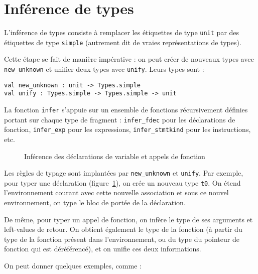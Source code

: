 \section{Inférence de types}

L'inférence de types consiste à remplacer les étiquettes de type \texttt{unit}
par des étiquettes de type \texttt{simple} (autrement dit de vraies
représentations de types).

Cette étape se fait de manière impérative : on peut créer de nouveaux types avec
\texttt{new\_unknown} et unifier deux types
avec \texttt{unify}. Leurs types sont :

\begin{verbatim}
val new_unknown : unit -> Types.simple
val unify : Types.simple -> Types.simple -> unit
\end{verbatim}

La fonction \texttt{infer} s'appuie sur un ensemble de fonctions récursivement
définies portant sur chaque type de fragment : \texttt{infer\_fdec} pour les
déclarations de fonction, \texttt{infer\_exp} pour les expressions,
\texttt{infer\_stmtkind} pour les instructions, etc.

\begin{figure}



\caption{Inférence des déclarations de variable et appels de
         fonction}

\label{fig:implem-unif-stmt}
\end{figure}

Les règles de typage sont implantées par \texttt{new\_unknown} et
\texttt{unify}. Par exemple, pour typer une déclaration
(figure~\ref{fig:implem-unif-stmt}), on crée un nouveau
type \texttt{t0}. On étend l'environnement courant avec cette nouvelle
association et sous ce nouvel environnement, on type le bloc de portée de la
déclaration.

De même, pour typer un appel de fonction, on infère le type de ses arguments et
left-values de retour. On obtient également le type de la fonction (à partir du
type de la fonction présent dans l'environnement, ou du type du pointeur de
fonction qui est déréférencé), et on unifie ces deux informations.

On peut donner quelques exemples, comme :

